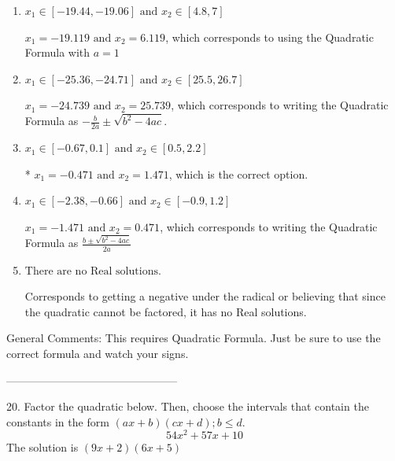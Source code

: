 \documentclass{extbook}[14pt]
\begin{document}
\begin{enumerate}[label=\Alph*.] 
\item $ x_1 \in [-19.44, -19.06] \text{ and } x_2 \in [4.8, 7] $ 

  $x_1 = -19.119 \text{ and } x_2 = 6.119$, which corresponds to using the Quadratic Formula with $a=1$ 
\item $ x_1 \in [-25.36, -24.71] \text{ and } x_2 \in [25.5, 26.7] $ 

  $x_1 = -24.739 \text{ and } x_2 = 25.739$, which corresponds to writing the Quadratic Formula as $-\frac{b}{2a} \pm \sqrt{b^2 - 4ac}$. 
\item $ x_1 \in [-0.67, 0.1] \text{ and } x_2 \in [0.5, 2.2] $ 

 * $x_1 = -0.471 \text{ and } x_2 = 1.471$, which is the correct option. 
\item $ x_1 \in [-2.38, -0.66] \text{ and } x_2 \in [-0.9, 1.2] $ 

  $x_1 = -1.471 \text{ and } x_2 = 0.471$, which corresponds to writing the Quadratic Formula as $\frac{b \pm \sqrt{b^2 - 4ac}}{2a}$ 
\item $ \text{There are no Real solutions.} $ 

 Corresponds to getting a negative under the radical or believing that since the quadratic cannot be factored, it has no Real solutions. 
\end{enumerate} 
 
General Comments: This requires Quadratic Formula. Just be sure to use the correct formula and watch your signs.

-----------------------------------------------

20. Factor the quadratic below. Then, choose the intervals that contain the constants in the form $(ax+b)(cx+d); b \leq d.$
\[ 54x^{2} +57 x + 10 \] 
The solution is $ (9x + 2)(6x + 5) $ 
\end{document}
